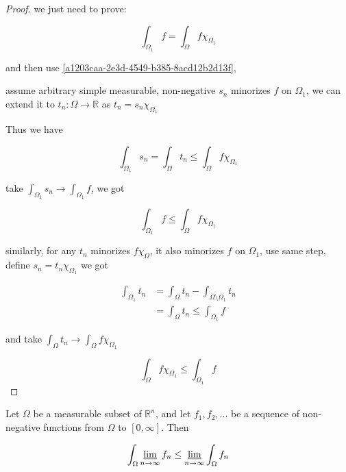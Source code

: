 \begin{proof}
    we just need to prove:

    \[
        \int_{\Omega_1} f = \int_{\Omega} f \chi_{\Omega_1}
    \]

    and then use \autoref{a1203caa-2e3d-4549-b385-8acd12b2d13f},

    assume arbitrary simple measurable, non-negative $s_n$ minorizes $f$ on $\Omega_1$, we can extend it to $t_n: \Omega \to \mathbb{R}$ as
    $t_n = s_n \chi_{\Omega_1}$

    Thus we have

    \[
        \int_{\Omega_1}s_n = \int_{\Omega}t_n \le \int_{\Omega} f \chi_{\Omega_1}
    \]

    take $\int_{\Omega_1}s_n \to \int_{\Omega_1} f$, we got

    \[
\int_{\Omega_1} f \le \int_{\Omega} f \chi_{\Omega_1}
    \]

    similarly, for any $t_n$ minorizes $f \chi_{\Omega}$, it also minorizes $f$ on $\Omega_1$, 
    use same step, define $s_n = t_n \chi_{\Omega_1}$ we got

    \begin{align*}
        \int_{\Omega_1}t_n &= \int_{\Omega}t_n - \int_{\Omega \setminus \Omega_1}t_n \\
        &=\int_{\Omega}t_n \le \int_{\Omega_1}f 
    \end{align*}

    and take $\int_{\Omega}t_n \to \int_{\Omega}f \chi_{\Omega_1}$

    \[
        \int_{\Omega}f\chi_{\Omega_1} \le \int_{\Omega_1}f 
    \]
\end{proof}

\begin{thm}
    \label{thm:fatous-lemma}
     Let $\Omega$ be a measurable subset of $\mathbb{R}^n$, and let
     $f_1,f_2,...$ be a sequence of non-negative functions from $\Omega$ to $[0, \infty]$.
     Then

     \[
        \int_{\Omega} \varliminf_{n \to \infty} f_n \le \varliminf_{n \to \infty} \int_{\Omega}  f_n
     \]
\end{thm}

